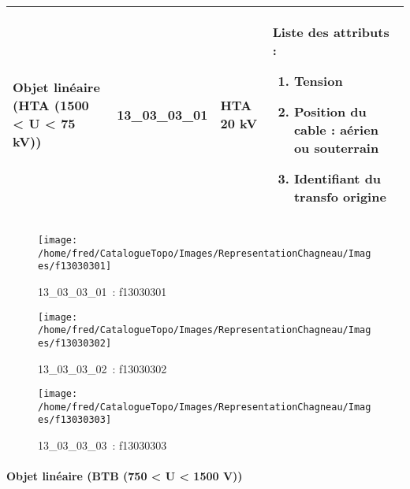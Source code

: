\documentclass[12pt,titlepage]{book}
\begin{document}
\renewcommand{\arraystretch}{1.2}
\begin{supertabular}{|p{10cm}|c|p{13cm}|p{12cm}|}
 Objet linéaire (HTA (1500 < U < 75 kV)) & 13\_03\_03\_01 & HTA 20 kV & Liste des attributs :
\begin{enumerate}
  \item Tension  \item Position du cable : aérien ou souterrain  \item Identifiant du transfo origine\end{enumerate}
\\
\hline
\end{supertabular}
\begin{figure}[h!]
  \hfill         %
  \begin{minipage}[t]{3cm}
    \begin{center}
      \texttt{[image: /home/fred/CatalogueTopo/Images/RepresentationChagneau/Images/f13030301]}
      \caption[~13\_03\_03\_01]{\small{13\_03\_03\_01~:} \tiny{f13030301}}\label{f13030301}
    \end{center}
  \end{minipage}
  \begin{minipage}[t]{3cm}
    \begin{center}
      \texttt{[image: /home/fred/CatalogueTopo/Images/RepresentationChagneau/Images/f13030302]}
      \caption[~13\_03\_03\_02]{\small{13\_03\_03\_02~:} \tiny{f13030302}}\label{f13030302}
    \end{center}
  \end{minipage}
  \begin{minipage}[t]{3cm}
    \begin{center}
      \texttt{[image: /home/fred/CatalogueTopo/Images/RepresentationChagneau/Images/f13030303]}
      \caption[~13\_03\_03\_03]{\small{13\_03\_03\_03~:} \tiny{f13030303}}\label{f13030303}
    \end{center}
  \end{minipage}
\end{figure}


\paragraph{Objet linéaire (BTB (750 < U < 1500 V))}
\noindent
\vspace{\baselineskip}
\end{document}
